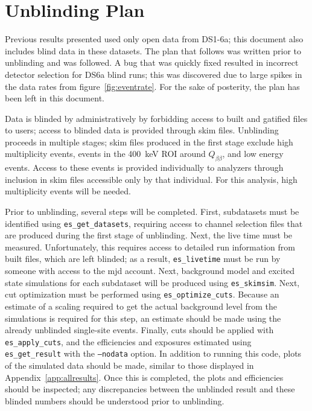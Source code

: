\documentclass[notitlepage,rmp,aps,10pt]{revtex4-1}
\newcommand{\Qbb}{$Q_{\beta\beta}$}
\begin{document}
\section{Unblinding Plan}
Previous results presented used only open data from DS1-6a; this document also includes blind data in these datasets.
The plan that follows was written prior to unblinding and was followed.
A bug that was quickly fixed resulted in incorrect detector selection for DS6a blind runs; this was discovered due to large spikes in the data rates from figure~\ref{fig:eventrate}.
For the sake of posterity, the plan has been left in this document.

Data is blinded by administratively by forbidding access to built and gatified files to users; access to blinded data is provided through skim files.
Unblinding proceeds in multiple stages; skim files produced in the first stage exclude high multiplicity events, events in the 400~keV ROI around \Qbb, and low energy events.
Access to these events is provided individually to analyzers through inclusion in skim files accessible only by that individual.
For this analysis, high multiplicity events will be needed.

Prior to unblinding, several steps will be completed.
First, subdatasets must be identified using \texttt{es\_get\_datasets}, requiring access to channel selection files that are produced during the first stage of unblinding.
Next, the live time must be measured. Unfortunately, this requires access to detailed run information from built files, which are left blinded; as a result, \texttt{es\_livetime} must be run by someone with access to the mjd account.
Next, background model and excited state simulations for each subdataset will be produced using \texttt{es\_skimsim}.
Next, cut optimization must be performed using \texttt{es\_optimize\_cuts}.
Because an estimate of a scaling required to get the actual background level from the simulations is required for this step, an estimate should be made using the already unblinded single-site events.
Finally, cuts should be applied with \texttt{es\_apply\_cuts}, and the efficiencies and exposures estimated using \texttt{es\_get\_result} with the \texttt{--nodata} option.
In addition to running this code, plots of the simulated data should be made, similar to those displayed in Appendix~\ref{app:allresults}.
Once this is completed, the plots and efficiencies should be inspected; any discrepancies between the unblinded result and these blinded numbers should be understood prior to unblinding.
\end{document}
